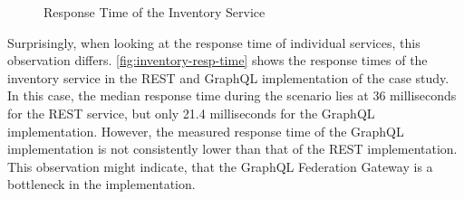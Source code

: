 \begin{figure}[h!]
    \centering
    \caption{Response Time of the Inventory Service}\label{fig:inventory-resp-time}    
\end{figure}

Surprisingly, when looking at the response time of individual services, this observation differs.
\autoref{fig:inventory-resp-time} shows the response times of the inventory service in the \ac{REST} and GraphQL implementation of the case study.
In this case, the median response time during the scenario lies at 36 milliseconds for the \ac{REST} service, but only 21.4 milliseconds for the GraphQL implementation.
However, the measured response time of the GraphQL implementation is not consistently lower than that of the \ac{REST} implementation.
This observation might indicate, that the GraphQL Federation Gateway is a bottleneck in the implementation.


